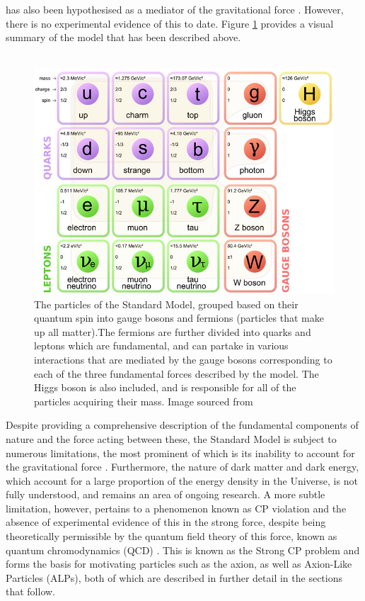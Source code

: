 has also been hypothesised as a mediator of the gravitational force \cite{Holstein:2006bh}. However, there is no experimental evidence of this to date. Figure \ref{StandardModel} provides a visual summary of the model that has been described above.\\
\\
\begin{figure}[H]
    \centering
    \includegraphics[scale = 0.4]{StandardModel.jpg}
    \caption{The particles of the Standard Model, grouped based on their quantum spin into gauge bosons and fermions (particles that make up all matter).The fermions are further divided into quarks and leptons which are fundamental, and can partake in various interactions that are mediated by the gauge bosons corresponding to each of the three fundamental forces described by the model. The Higgs boson is also included, and is responsible for all of the particles acquiring their mass. Image sourced from \cite{SM_Picture}}
    \label{StandardModel}
\end{figure}
Despite providing a comprehensive description of the fundamental components of nature and the force acting between these, the Standard Model is subject to numerous limitations, the most prominent of which is its inability to account for the gravitational force \cite{Holstein:2006bh}. Furthermore, the nature of dark matter and dark energy, which account for
a large proportion of the energy density in the Universe, is not fully understood, and remains an area of ongoing research. A more subtle limitation, however, pertains to a phenomenon known as CP violation and the absence of experimental evidence of this in the strong force, despite being theoretically permissible by the quantum field theory of this force,
known as quantum chromodynamics (QCD) \cite{Garcia_Irastorza_2022}. This is known as the Strong CP problem and forms the basis for motivating particles such as the axion, as well as Axion-Like Particles (ALPs), both of which are described in further detail in the sections that follow.
